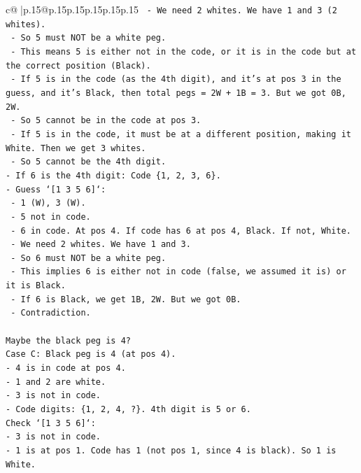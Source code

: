 \documentclass{article}
\begin{document}
{\begin{supertabular}{c@{$\;$}|p{.15\linewidth}@{}p{.15\linewidth}p{.15\linewidth}p{.15\linewidth}p{.15\linewidth}p{.15\linewidth}}
{{{\texttt{  {-} We need 2 whites. We have 1 and 3 (2 whites).} \\
\texttt{  {-} So 5 must NOT be a white peg.} \\
\texttt{  {-} This means 5 is either not in the code, or it is in the code but at the correct position (Black).} \\
\texttt{  {-} If 5 is in the code (as the 4th digit), and it's at pos 3 in the guess, and it's Black, then total pegs = 2W + 1B = 3. But we got 0B, 2W.} \\
\texttt{  {-} So 5 cannot be in the code at pos 3.} \\
\texttt{  {-} If 5 is in the code, it must be at a different position, making it White. Then we get 3 whites.} \\
\texttt{  {-} So 5 cannot be the 4th digit.} \\
\texttt{{-} If 6 is the 4th digit: Code \{1, 2, 3, 6\}.} \\
\texttt{{-} Guess `{[}1 3 5 6{]}`:} \\
\texttt{  {-} 1 (W), 3 (W).} \\
\texttt{  {-} 5 not in code.} \\
\texttt{  {-} 6 in code. At pos 4. If code has 6 at pos 4, Black. If not, White.} \\
\texttt{  {-} We need 2 whites. We have 1 and 3.} \\
\texttt{  {-} So 6 must NOT be a white peg.} \\
\texttt{  {-} This implies 6 is either not in code (false, we assumed it is) or it is Black.} \\
\texttt{  {-} If 6 is Black, we get 1B, 2W. But we got 0B.} \\
\texttt{  {-} Contradiction.} \\
\\ 
\texttt{Maybe the black peg is 4?} \\
\texttt{Case C: Black peg is 4 (at pos 4).} \\
\texttt{{-} 4 is in code at pos 4.} \\
\texttt{{-} 1 and 2 are white.} \\
\texttt{{-} 3 is not in code.} \\
\texttt{{-} Code digits: \{1, 2, 4, ?\}. 4th digit is 5 or 6.} \\
\texttt{Check `{[}1 3 5 6{]}`:} \\
\texttt{{-} 3 is not in code.} \\
\texttt{{-} 1 is at pos 1. Code has 1 (not pos 1, since 4 is black). So 1 is White.} \\
}}}
\end{supertabular}}
\end{document}
